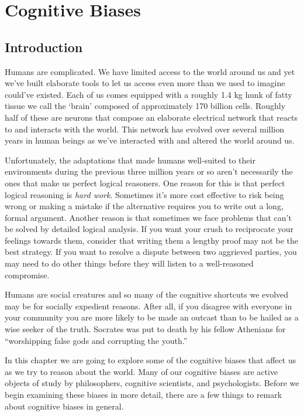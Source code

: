 \chapter{Cognitive Biases}
\label{ch:cognitivebiases}
\setlength{\parindent}{1em}

\section{Introduction}

Humans are complicated. We have limited access to the world around us and yet we've built elaborate tools to let us access even more than we used to imagine could've existed. Each of us comes equipped with a roughly 1.4 kg hunk of fatty tissue we call the `brain' composed of approximately 170 billion cells. Roughly half of these are neurons that compose an elaborate electrical network that reacts to and interacts with the world. This network has evolved over several million years in human beings as we've interacted with and altered the world around us.

Unfortunately, the adaptations that made humans well-suited to their environments during the previous three million years or so aren't necessarily the ones that make us perfect logical reasoners. One reason for this is that perfect logical reasoning is \emph{hard work}. Sometimes it's more cost effective to risk being wrong or making a mistake if the alternative requires you to write out a long, formal argument. Another reason is that sometimes we face problems that can't be solved by detailed logical analysis. If you want your crush to reciprocate your feelings towards them, consider that writing them a lengthy proof may not be the best strategy. If you want to resolve a dispute between two aggrieved parties, you may need to do other things before they will listen to a well-reasoned compromise.

Humans are social creatures and so many of the cognitive shortcuts we evolved may be for socially expedient reasons. After all, if you disagree with everyone in your community you are more likely to be made an outcast than to be hailed as a wise seeker of the truth. Socrates was put to death by his fellow Athenians for ``worshipping false gods and corrupting the youth.''

In this chapter we are going to explore some of the cognitive biases that affect us as we try to reason about the world. Many of our cognitive biases are active objects of study by philosophers, cognitive scientists, and psychologists. Before we begin examining these biases in more detail, there are a few things to remark about cognitive biases in general.

